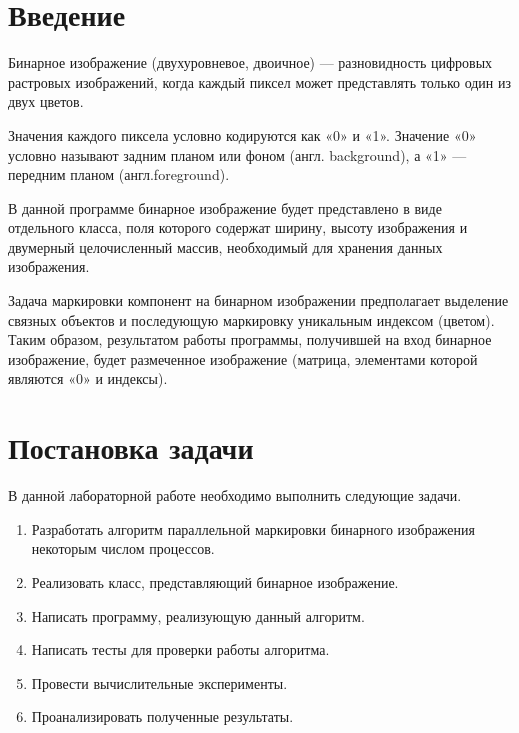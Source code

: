 \documentclass{report}
\begin{document}
\setcounter{page}{2}

\tableofcontents
\newpage

\section*{Введение}
Бинарное  изображение  (двухуровневое,  двоичное)  —  разновидность  цифровых растровых изображений, когда каждый пиксел может представлять только один из двух цветов.
\par Значения  каждого  пиксела  условно  кодируются  как  «0»  и  «1».  Значение  «0»  условно называют  задним  планом  или  фоном  (англ.  background),  а  «1»  —  передним  планом  (англ.foreground).
\par В данной программе бинарное изображение будет представлено в виде отдельного класса, поля  которого  содержат  ширину,  высоту  изображения  и  двумерный  целочисленный  массив, необходимый для хранения данных изображения.
\par Задача  маркировки  компонент  на  бинарном  изображении  предполагает  выделение связных объектов и последующую маркировку уникальным индексом (цветом). Таким образом, результатом работы программы, получившей на вход бинарное изображение, будет размеченное изображение (матрица, элементами которой являются «0» и индексы).
\newpage

\section*{Постановка задачи}
В данной лабораторной работе необходимо выполнить следующие задачи.
\begin{enumerate} 
\item Разработать алгоритм  параллельной  маркировки бинарного изображения  некоторым 
числом процессов.
\item Реализовать класс, представляющий бинарное изображение.
\item Написать программу, реализующую данный алгоритм.
\item Написать тесты для проверки работы алгоритма.
\item Провести вычислительные эксперименты.
\item Проанализировать полученные результаты.
\end{enumerate}
\newpage

\end{document}
